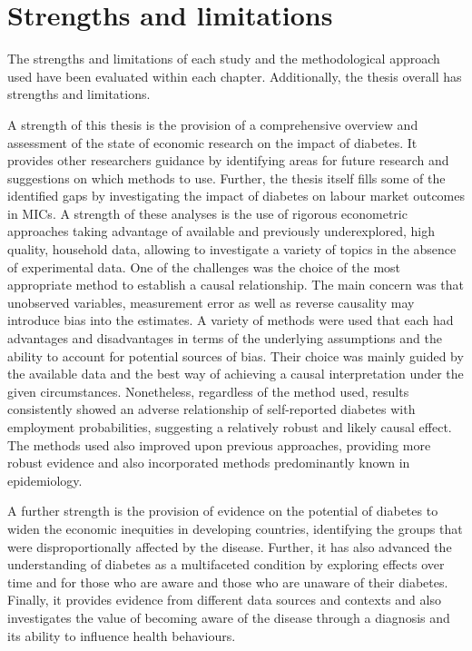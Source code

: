 \section{Strengths and limitations}

The strengths and limitations of each study and the methodological approach used have been evaluated within each chapter. Additionally, the thesis overall has strengths and limitations.


A strength of this thesis is the provision of a comprehensive overview and assessment of the state of economic research on the impact of diabetes. It provides other researchers guidance by identifying areas for future research and suggestions on which methods to use. Further, the thesis itself fills some of the identified gaps by investigating the impact of diabetes on labour market outcomes in \acp{MIC}. A strength of these analyses is the use of rigorous econometric approaches taking advantage of available and previously underexplored, high quality, household data, allowing to investigate a variety of topics in the absence of experimental data. One of the challenges was the choice of the most appropriate method to establish a causal relationship. The main concern was that unobserved variables, measurement error as well as reverse causality may introduce bias into the estimates. A variety of methods were used that each had advantages and disadvantages in terms of the underlying assumptions and the ability to account for potential sources of bias. Their choice was mainly guided by the available data and the best way of achieving a causal interpretation under the given circumstances. Nonetheless, regardless of the method used, results consistently showed an adverse relationship of self-reported diabetes with employment probabilities, suggesting a relatively robust and likely causal effect. The methods used also improved upon previous approaches, providing more robust evidence and also incorporated methods predominantly known in epidemiology. 

A further strength is the provision of evidence on the potential of diabetes to widen the economic inequities in developing countries, identifying the groups that were disproportionally affected by the disease. Further, it has also advanced the understanding of diabetes as a multifaceted condition by exploring effects over time and for those who are aware and those who are unaware of their diabetes. Finally, it provides evidence from different data sources and contexts and also investigates the value of becoming aware of the disease through a diagnosis and its ability to influence health behaviours.

